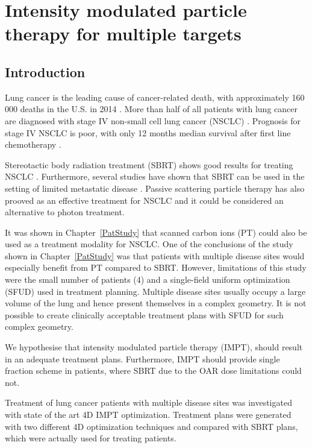 \documentclass[type=dr, dr=rernat, accentcolor=tud7b,colorbacktitle, bigchapter, openright, twoside, 12pt ]{tudthesis}
\begin{document}
\chapter{Intensity modulated particle therapy for multiple targets}
\label{chapter:complex}
\minitoc

\section{Introduction}

Lung cancer is the leading cause of cancer-related death, with approximately 160 000 deaths in the U.S. in 2014 \cite{Siegel2014}.
More than half of all patients with lung cancer are diagnosed with stage IV non-small cell lung cancer (NSCLC) \cite{Ramalingam2008, Iyengar2014}.
Prognosis for stage IV NSCLC is poor, with only 12 months median survival after first line chemotherapy \cite{Socinski2013}. 

Stereotactic body radiation treatment (SBRT) shows good results for treating NSCLC \cite{Baumann2009, Fakiris2009, Grutters2010, Greco2011}. 
Furthermore, several studies have shown that SBRT can be used in the setting of limited metastatic 
disease \cite{Rusthoven2009, Villaruz2012, Salama2012, Iyengar2014}. 
Passive scattering particle therapy has also prooved as an effective treatment for NSCLC \cite{Grutters2010, Tsujii2012} and it could be considered an alternative
to photon treatment.

It was shown in Chapter~\ref{PatStudy} that scanned carbon ions (PT) could also be used as a treatment modality for NSCLC. One of the conclusions of the study shown in Chapter~\ref{PatStudy} 
was that patients with multiple disease sites would especially benefit from PT compared to SBRT. However, limitations of this study were the small number of patients (4) and
a single-field uniform optimization (SFUD) used in treatment planning. Multiple disease sites usually occupy a large volume of the lung and hence present themselves in a complex geometry. 
It is not possible to create clinically acceptable treatment plans with SFUD for such complex geometry.

We hypothesise that intensity modulated particle therapy (IMPT), should result in an adequate treatment plans. Furthermore, IMPT 
should provide single fraction scheme in patients, where SBRT due to the OAR dose limitations could not. 

Treatment of lung cancer patients  with multiple disease sites was investigated with state of the art 4D IMPT optimization. 
Treatment plans were generated with two different 4D optimization techniques and compared with SBRT plans, which were actually used for treating patients.
\end{document}
